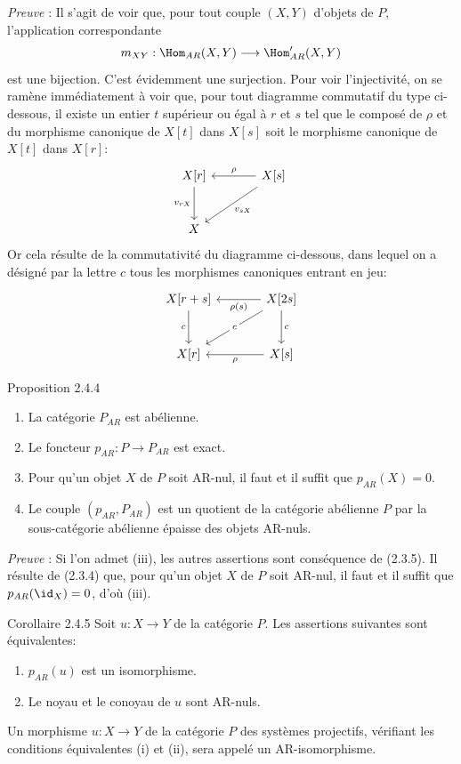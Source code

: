\emph{Preuve} : Il s'agit de voir que, pour tout couple $(X,Y)$ d'objets de $P$, l'application correspondante
\[
m_{XY}:\Hom_{AR}(X,Y)\longrightarrow\Hom'_{AR}(X,Y)
\]
est une bijection. C'est évidemment une surjection. Pour voir l'injectivité, on se ramène immédiatement à voir que, pour tout diagramme commutatif du type ci-dessous, il existe un entier $t$ supérieur ou égal à $r$ et $s$ tel que le composé de $\rho$ et du morphisme canonique de $X[t]$ dans $X[s]$ soit le morphisme canonique de $X[t]$ dans $X[r]$:
\[
\begin{tikzcd}[column sep=large,row sep=large]
X[r] \arrow[d,"{v_{rX}}"'] & X[s] \arrow[l,"\rho"'] \arrow[dl,"{v_{sX}}"]\\
X & {}
\end{tikzcd}
\]
Or cela résulte de la commutativité du diagramme ci-dessous, dans lequel on a désigné par la lettre $c$ tous les morphismes canoniques entrant en jeu:
\[
\begin{tikzcd}[column sep=large,row sep=large]
X[r+s] \arrow[d,"c"'] & X[2s] \arrow[l,"\rho(s)"] \arrow[d,"c"] \arrow[dl,"c" description]\\
X[r] & X[s] \arrow[l,"\rho"]
\end{tikzcd}
\]

\begin{statement}{Proposition 2.4.4}
\begin{enumerate}[label=(\roman*)]
\item La catégorie $P_{AR}$ est abélienne.
\item Le foncteur $p_{AR}:P\to P_{AR}$ est exact.
\item Pour qu'un objet $X$ de $P$ soit AR-nul, il faut et il suffit que $p_{AR}(X)=0$.
\item Le couple $(p_{AR},P_{AR})$ est un quotient de la catégorie abélienne $P$ par la sous-catégorie abélienne épaisse des objets AR-nuls.
\end{enumerate}
\end{statement}

\emph{Preuve} : Si l'on admet (iii), les autres assertions sont conséquence de (2.3.5). Il résulte de (2.3.4) que, pour qu'un objet $X$ de $P$ soit AR-nul, il faut et il suffit que $p_{AR}(\id_X)=0$, d'où (iii).

\begin{statement}{Corollaire 2.4.5}
Soit $u:X\to Y$ de la catégorie $P$. Les assertions suivantes sont équivalentes:
\begin{enumerate}[label=(\roman*)]
\item $p_{AR}(u)$ est un isomorphisme.
\item Le noyau et le conoyau de $u$ sont AR-nuls.
\end{enumerate}
Un morphisme $u:X\to Y$ de la catégorie $P$ des systèmes projectifs, vérifiant les conditions équivalentes (i) et (ii), sera appelé un AR-isomorphisme.
\end{statement}

